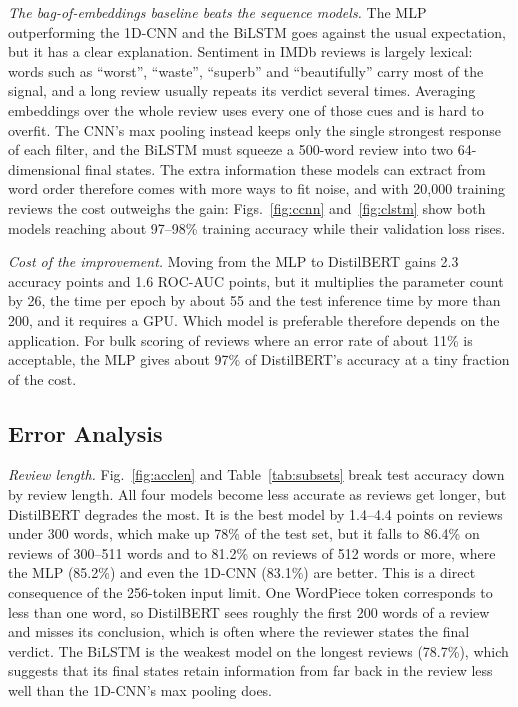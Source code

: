 \documentclass[conference,onecolumn,a4paper,10pt]{IEEEtran}
\begin{document}
\textit{The bag-of-embeddings baseline beats the sequence models.} The MLP outperforming the 1D-CNN and the BiLSTM goes against the usual expectation, but it has a clear explanation. Sentiment in IMDb reviews is largely lexical: words such as ``worst'', ``waste'', ``superb'' and ``beautifully'' carry most of the signal, and a long review usually repeats its verdict several times. Averaging embeddings over the whole review uses every one of those cues and is hard to overfit. The CNN's max pooling instead keeps only the single strongest response of each filter, and the BiLSTM must squeeze a 500-word review into two 64-dimensional final states. The extra information these models can extract from word order therefore comes with more ways to fit noise, and with 20,000 training reviews the cost outweighs the gain: Figs.~\ref{fig:ccnn} and~\ref{fig:clstm} show both models reaching about 97--98\% training accuracy while their validation loss rises.

\textit{Cost of the improvement.} Moving from the MLP to DistilBERT gains 2.3 accuracy points and 1.6 ROC-AUC points, but it multiplies the parameter count by 26, the time per epoch by about 55 and the test inference time by more than 200, and it requires a GPU. Which model is preferable therefore depends on the application. For bulk scoring of reviews where an error rate of about 11\% is acceptable, the MLP gives about 97\% of DistilBERT's accuracy at a tiny fraction of the cost.

\subsection{Error Analysis}
\textit{Review length.} Fig.~\ref{fig:acclen} and Table~\ref{tab:subsets} break test accuracy down by review length. All four models become less accurate as reviews get longer, but DistilBERT degrades the most. It is the best model by 1.4--4.4 points on reviews under 300 words, which make up 78\% of the test set, but it falls to 86.4\% on reviews of 300--511 words and to 81.2\% on reviews of 512 words or more, where the MLP (85.2\%) and even the 1D-CNN (83.1\%) are better. This is a direct consequence of the 256-token input limit. One WordPiece token corresponds to less than one word, so DistilBERT sees roughly the first 200 words of a review and misses its conclusion, which is often where the reviewer states the final verdict. The BiLSTM is the weakest model on the longest reviews (78.7\%), which suggests that its final states retain information from far back in the review less well than the 1D-CNN's max pooling does.
\end{document}

